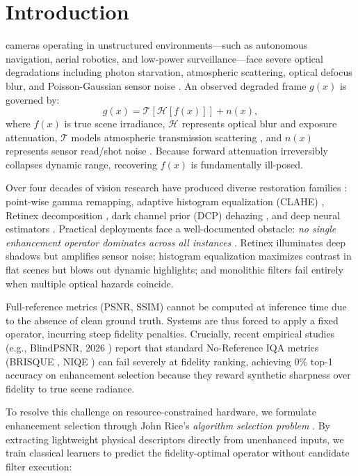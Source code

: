 \documentclass[journal]{IEEEtran}
\begin{document}
\section{Introduction}
 cameras operating in unstructured environments—such as autonomous navigation, aerial robotics, and low-power surveillance—face severe optical degradations including photon starvation, atmospheric scattering, optical defocus blur, and Poisson-Gaussian sensor noise \cite{zheng2024lowlight, wei2018deep}. An observed degraded frame $g(x)$ is governed by:
\begin{equation}
g(x) = \mathcal{T}[\mathcal{H}[f(x)]] + n(x),
\label{eq:degradation_model}
\end{equation}
where $f(x)$ is true scene irradiance, $\mathcal{H}$ represents optical blur and exposure attenuation, $\mathcal{T}$ models atmospheric transmission scattering \cite{he2011single}, and $n(x)$ represents sensor read/shot noise \cite{chen2018learning}. Because forward attenuation irreversibly collapses dynamic range, recovering $f(x)$ is fundamentally ill-posed.

Over four decades of vision research have produced diverse restoration families \cite{zheng2024lowlight}: point-wise gamma remapping, adaptive histogram equalization (CLAHE) \cite{zuiderveld1994contrast}, Retinex decomposition \cite{jobson1997multiscale}, dark channel prior (DCP) dehazing \cite{he2011single}, and deep neural estimators \cite{wei2018deep, guo2020zero}. Practical deployments face a well-documented obstacle: \textit{no single enhancement operator dominates across all instances} \cite{wolpert1997no}. Retinex illuminates deep shadows but amplifies sensor noise; histogram equalization maximizes contrast in flat scenes but blows out dynamic highlights; and monolithic filters fail entirely when multiple optical hazards coincide.

Full-reference metrics (PSNR, SSIM) \cite{wang2004image} cannot be computed at inference time due to the absence of clean ground truth. Systems are thus forced to apply a fixed operator, incurring steep fidelity penalties. Crucially, recent empirical studies (e.g., BlindPSNR, 2026 \cite{lyu2026blindpsnr}) report that standard No-Reference IQA metrics (BRISQUE \cite{mittal2012no}, NIQE \cite{mittal2013making}) can fail severely at fidelity ranking, achieving 0\% top-1 accuracy on enhancement selection because they reward synthetic sharpness over fidelity to true scene radiance.

To resolve this challenge on resource-constrained hardware, we formulate enhancement selection through John Rice's \textit{algorithm selection problem} \cite{rice1976algorithm}. By extracting lightweight physical descriptors directly from unenhanced inputs, we train classical learners to predict the fidelity-optimal operator without candidate filter execution:
\end{document}
